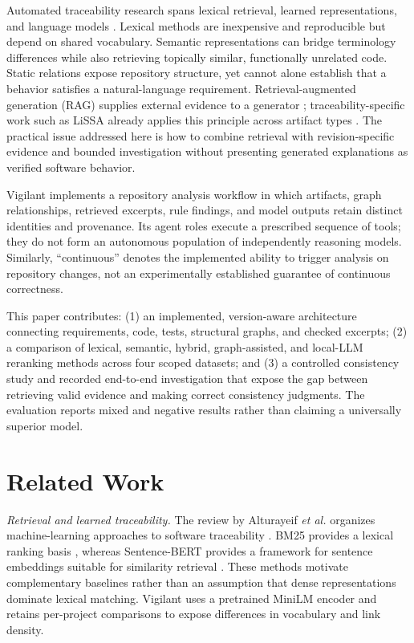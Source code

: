 \documentclass[conference,letterpaper,10pt]{IEEEtran}
\begin{document}
Automated traceability research spans lexical retrieval, learned representations, and language models \cite{slr}. Lexical methods are inexpensive and reproducible but depend on shared vocabulary. Semantic representations can bridge terminology differences while also retrieving topically similar, functionally unrelated code. Static relations expose repository structure, yet cannot alone establish that a behavior satisfies a natural-language requirement. Retrieval-augmented generation (RAG) supplies external evidence to a generator \cite{rag}; traceability-specific work such as LiSSA already applies this principle across artifact types \cite{lissa}. The practical issue addressed here is how to combine retrieval with revision-specific evidence and bounded investigation without presenting generated explanations as verified software behavior.

Vigilant implements a repository analysis workflow in which artifacts, graph relationships, retrieved excerpts, rule findings, and model outputs retain distinct identities and provenance. Its agent roles execute a prescribed sequence of tools; they do not form an autonomous population of independently reasoning models. Similarly, ``continuous'' denotes the implemented ability to trigger analysis on repository changes, not an experimentally established guarantee of continuous correctness.

This paper contributes: (1) an implemented, version-aware architecture connecting requirements, code, tests, structural graphs, and checked excerpts; (2) a comparison of lexical, semantic, hybrid, graph-assisted, and local-LLM reranking methods across four scoped datasets; and (3) a controlled consistency study and recorded end-to-end investigation that expose the gap between retrieving valid evidence and making correct consistency judgments. The evaluation reports mixed and negative results rather than claiming a universally superior model.

\section{Related Work}
\textit{Retrieval and learned traceability.} The review by Alturayeif \emph{et al.} organizes machine-learning approaches to software traceability \cite{slr}. BM25 provides a lexical ranking basis \cite{bm25}, whereas Sentence-BERT provides a framework for sentence embeddings suitable for similarity retrieval \cite{sbert}. These methods motivate complementary baselines rather than an assumption that dense representations dominate lexical matching. Vigilant uses a pretrained MiniLM encoder and retains per-project comparisons to expose differences in vocabulary and link density.
\end{document}
